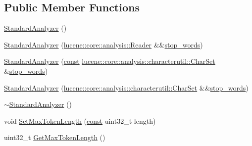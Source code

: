 \subsection*{Public Member Functions}
\begin{DoxyCompactItemize}
\item 
\mbox{\hyperlink{classlucene_1_1core_1_1analysis_1_1standard_1_1StandardAnalyzer_a96aade9f9e04262af76d6f69d5ba3103}{Standard\+Analyzer}} ()
\item 
\mbox{\hyperlink{classlucene_1_1core_1_1analysis_1_1standard_1_1StandardAnalyzer_afe3086be0798a7a38675170d12ef0d31}{Standard\+Analyzer}} (\mbox{\hyperlink{classlucene_1_1core_1_1analysis_1_1Reader}{lucene\+::core\+::analysis\+::\+Reader}} \&\&\mbox{\hyperlink{classlucene_1_1core_1_1analysis_1_1StopwordAnalyzerBase_a12ceda198e84aabe357ccd7b28e66d07}{stop\+\_\+words}})
\item 
\mbox{\hyperlink{classlucene_1_1core_1_1analysis_1_1standard_1_1StandardAnalyzer_a50b9c11d1c78184c0518fbf19c6486ce}{Standard\+Analyzer}} (\mbox{\hyperlink{ZlibCrc32_8h_a2c212835823e3c54a8ab6d95c652660e}{const}} \mbox{\hyperlink{classlucene_1_1core_1_1analysis_1_1characterutil_1_1CharSet}{lucene\+::core\+::analysis\+::characterutil\+::\+Char\+Set}} \&\mbox{\hyperlink{classlucene_1_1core_1_1analysis_1_1StopwordAnalyzerBase_a12ceda198e84aabe357ccd7b28e66d07}{stop\+\_\+words}})
\item 
\mbox{\hyperlink{classlucene_1_1core_1_1analysis_1_1standard_1_1StandardAnalyzer_acc4853fc9cc1c394d9d0e8b5d0d98796}{Standard\+Analyzer}} (\mbox{\hyperlink{classlucene_1_1core_1_1analysis_1_1characterutil_1_1CharSet}{lucene\+::core\+::analysis\+::characterutil\+::\+Char\+Set}} \&\&\mbox{\hyperlink{classlucene_1_1core_1_1analysis_1_1StopwordAnalyzerBase_a12ceda198e84aabe357ccd7b28e66d07}{stop\+\_\+words}})
\item 
\mbox{\hyperlink{classlucene_1_1core_1_1analysis_1_1standard_1_1StandardAnalyzer_a241082c932a211751c3d437886d50ba0}{$\sim$\+Standard\+Analyzer}} ()
\item 
void \mbox{\hyperlink{classlucene_1_1core_1_1analysis_1_1standard_1_1StandardAnalyzer_af00b69646ec366ab9319197824f12e4b}{Set\+Max\+Token\+Length}} (\mbox{\hyperlink{ZlibCrc32_8h_a2c212835823e3c54a8ab6d95c652660e}{const}} uint32\+\_\+t length)
\item 
uint32\+\_\+t \mbox{\hyperlink{classlucene_1_1core_1_1analysis_1_1standard_1_1StandardAnalyzer_a383601d5fa0bcd3883f794c887512517}{Get\+Max\+Token\+Length}} ()
\end{DoxyCompactItemize}
